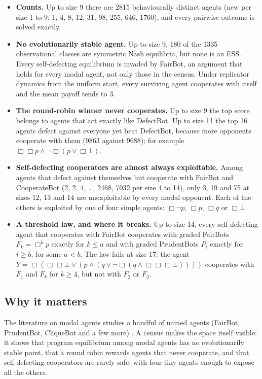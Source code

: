 \documentclass{article}
\begin{document}
\begin{itemize}
\item \textbf{Counts.} Up to size 9 there are 2815 behaviourally distinct agents (new per size 1 to 9: 1, 4, 8, 12, 31, 98, 255, 646, 1760), and every pairwise outcome is solved exactly.
\item \textbf{No evolutionarily stable agent.} Up to size 9, 180 of the 1335 observational classes are symmetric Nash equilibria, but none is an ESS. Every self-defecting equilibrium is invaded by FairBot, an argument that holds for every modal agent, not only those in the census. Under replicator dynamics from the uniform start, every surviving agent cooperates with itself and the mean payoff tends to 3.
\item \textbf{The round-robin winner never cooperates.} Up to size 9 the top score belongs to agents that act exactly like DefectBot. Up to size 11 the top 16 agents defect against everyone yet beat DefectBot, because more opponents cooperate with them (9863 against 9688); for example $\Box\Box p \wedge \neg\Box(p \vee \Box\bot)$.
\item \textbf{Self-defecting cooperators are almost always exploitable.} Among agents that defect against themselves but cooperate with FairBot and CooperateBot (2, 2, 4, \ldots{}, 2468, 7032 per size 4 to 14), only 3, 19 and 75 at sizes 12, 13 and 14 are unexploitable by every modal opponent. Each of the others is exploited by one of four simple agents: $\Box\neg p$, $\Box p$, $\Box q$ or $\Box\bot$.
\item \textbf{A threshold law, and where it breaks.} Up to size 14, every self-defecting agent that cooperates with FairBot cooperates with graded FairBots $F_k = \Box^k p$ exactly for $k \le a$ and with graded PrudentBots $P_i$ exactly for $i \ge b$, for some $a < b$. The law fails at size 17: the agent $Y = \Box(\Box\Box\bot \vee (p \wedge (q \vee \neg\Box(q \wedge \Box\Box\Box\bot))))$ cooperates with $F_1$ and $F_k$ for $k \ge 4$, but not with $F_2$ or $F_3$.
\end{itemize}

\subsection*{Why it matters}

The literature on modal agents studies a handful of named agents (FairBot, PrudentBot, CliqueBot
and a few more) \cite{barasz2014robust,lavictoire2014program}. A census makes the space itself
visible: it shows that program equilibrium among modal agents has no evolutionarily stable
point, that a round robin rewards agents that never cooperate, and that self-defecting
cooperators are rarely safe, with four tiny agents enough to expose all the others.
\end{document}
